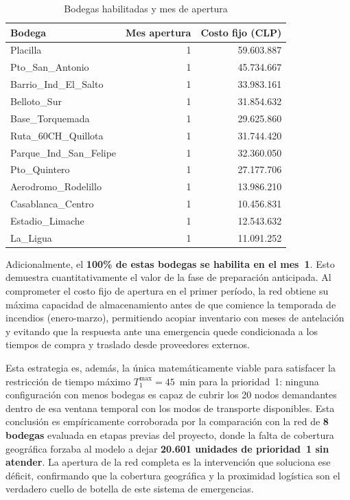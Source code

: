 \documentclass[letterpaper]{article}
\begin{document}
\begin{table}[H]
\centering
\caption{Bodegas habilitadas y mes de apertura}
\label{tab:bodegas}
\begin{tabular}{lrr}
\hline
\textbf{Bodega} & \textbf{Mes apertura} & \textbf{Costo fijo (CLP)} \\
\hline
Placilla                & 1 & 59.603.887 \\
Pto\_San\_Antonio       & 1 & 45.734.667 \\
Barrio\_Ind\_El\_Salto  & 1 & 33.983.161 \\
Belloto\_Sur            & 1 & 31.854.632 \\
Base\_Torquemada        & 1 & 29.625.860 \\
Ruta\_60CH\_Quillota    & 1 & 31.744.420 \\
Parque\_Ind\_San\_Felipe & 1 & 32.360.050 \\
Pto\_Quintero           & 1 & 27.177.706 \\
Aerodromo\_Rodelillo    & 1 & 13.986.210 \\
Casablanca\_Centro      & 1 & 10.456.831 \\
Estadio\_Limache        & 1 & 12.543.632 \\
La\_Ligua               & 1 & 11.091.252 \\
\hline
\end{tabular}
\end{table}

Adicionalmente, el \textbf{100\% de estas bodegas se habilita en el mes~1}.
Esto demuestra cuantitativamente el valor de la fase de preparación
anticipada. Al comprometer el costo fijo de apertura en el primer período, la
red obtiene su máxima capacidad de almacenamiento antes de que comience la
temporada de incendios (enero-marzo), permitiendo acopiar inventario con meses
de antelación y evitando que la respuesta ante una emergencia quede condicionada
a los tiempos de compra y traslado desde proveedores externos.

Esta estrategia es, además, la única matemáticamente viable para satisfacer la restricción de
tiempo máximo $T^{\max}_1 = 45$~min para la prioridad~1: ninguna configuración
con menos bodegas es capaz de cubrir los 20 nodos demandantes dentro de esa
ventana temporal con los modos de transporte disponibles. Esta conclusión es empíricamente corroborada por la comparación con la red de \textbf{8 bodegas} evaluada en etapas previas del proyecto, donde la falta de cobertura geográfica forzaba al modelo a dejar \textbf{20.601 unidades de prioridad~1 sin atender}. La apertura de la red completa es la intervención que soluciona ese déficit, confirmando que la cobertura geográfica y la proximidad logística son el verdadero cuello de botella de este sistema de emergencias.
\end{document}
